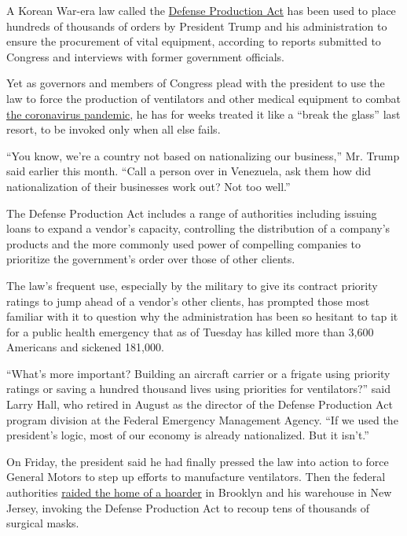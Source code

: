 A Korean War-era law called the
\href{https://www.nytimes.com/2020/07/22/us/politics/coronavirus-defense-production-act.html}{Defense
Production Act} has been used to place hundreds of thousands of orders
by President Trump and his administration to ensure the procurement of
vital equipment, according to reports submitted to Congress and
interviews with former government officials.

Yet as governors and members of Congress plead with the president to use
the law to force the production of ventilators and other medical
equipment to combat
\href{https://www.nytimes.com/news-event/coronavirus}{the coronavirus
pandemic}, he has for weeks treated it like a ``break the glass'' last
resort, to be invoked only when all else fails.

``You know, we're a country not based on nationalizing our business,''
Mr. Trump said earlier this month. ``Call a person over in Venezuela,
ask them how did nationalization of their businesses work out? Not too
well.''

The Defense Production Act includes a range of authorities including
issuing loans to expand a vendor's capacity, controlling the
distribution of a company's products and the more commonly used power of
compelling companies to prioritize the government's order over those of
other clients.

The law's frequent use, especially by the military to give its contract
priority ratings to jump ahead of a vendor's other clients, has prompted
those most familiar with it to question why the administration has been
so hesitant to tap it for a public health emergency that as of Tuesday
has killed more than 3,600 Americans and sickened 181,000.

``What's more important? Building an aircraft carrier or a frigate using
priority ratings or saving a hundred thousand lives using priorities for
ventilators?'' said Larry Hall, who retired in August as the director of
the Defense Production Act program division at the Federal Emergency
Management Agency. ``If we used the president's logic, most of our
economy is already nationalized. But it isn't.''

On Friday, the president said he had finally pressed the law into action
to force General Motors to step up efforts to manufacture ventilators.
Then the federal authorities
\href{https://www.justice.gov/usao-nj/pr/brooklyn-man-arrested-assaulting-fbi-agents-and-making-false-statements-about-his}{raided
the home of a hoarder} in Brooklyn and his warehouse in New Jersey,
invoking the Defense Production Act to recoup tens of thousands of
surgical masks.

